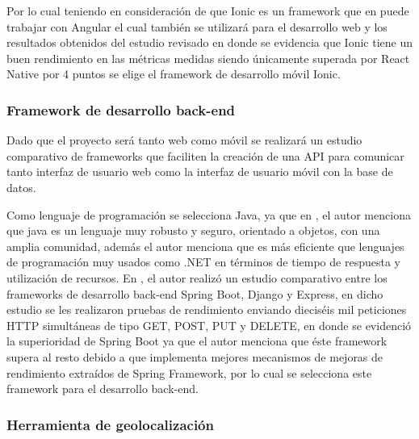 \begin{footnotesize}
\begin{spacing}{1}
\begin{center}
\begin{longtable}[c]{ |>{\bfseries}p{}  |p{} |p{}  |p{}  |p{}  |p{}  |p{}|   }
                \hline
            \end{longtable}
        \end{center}

\end{spacing}
\end{footnotesize}

Por lo cual teniendo en consideración de que Ionic es un framework que en puede trabajar con Angular el cual también se utilizará para el desarrollo web y los resultados obtenidos del estudio revisado en donde se evidencia que Ionic tiene un buen rendimiento en las métricas medidas siendo únicamente superada por React Native por 4 puntos se elige el framework de desarrollo móvil Ionic.

\subsubsection{Framework de desarrollo back-end}

Dado que el proyecto será tanto web como móvil se realizará un estudio comparativo de frameworks que faciliten la creación de una API para comunicar tanto interfaz de usuario web como la interfaz de usuario móvil con la base de datos.
\bigbreak

Como lenguaje de programación se selecciona Java, ya que en \cite{zhang_design_2021}, el autor menciona que java es un lenguaje muy robusto y seguro, orientado a objetos, con una amplia comunidad, además el autor menciona que es más eficiente que lenguajes de programación muy usados como .NET en términos de tiempo de respuesta y utilización de recursos.
\bigbreak
En \cite{choma_efficiency_2023}, el autor realizó un estudio comparativo entre los frameworks de desarrollo back-end Spring Boot, Django y Express, en dicho estudio se les realizaron pruebas de rendimiento enviando dieciséis mil peticiones HTTP simultáneas de tipo GET, POST, PUT y DELETE, en donde se evidenció la superioridad de Spring Boot ya que el autor menciona que éste framework supera al resto debido a que implementa mejores mecanismos de mejoras de rendimiento extraídos de Spring Framework, por lo cual se selecciona este framework para el desarrollo back-end.
\bigbreak

\subsubsection{Herramienta de geolocalización}


